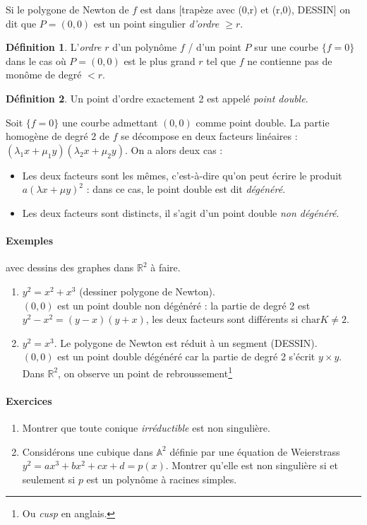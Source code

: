 \documentclass[a4paper, 11pt]{article}
\theoremstyle{definition}
\newtheorem{définition}{Définition}
\newcommand{\real}{\mathbb{R}}
\newcommand{\aff}{\mathbb{A}}
\newcommand{\carac}{\textrm{char}}
\begin{document}
Si le polygone de Newton de $f$ est dans [trapèze avec (0,r) et (r,0),
DESSIN] on dit que $P = (0,0)$ est un point singulier \emph{d'ordre
  $\geq r$}.

\begin{définition}
  L'\emph{ordre} $r$ d'un polynôme $f$ / d'un point $P$ sur une courbe
  $\{f=0\}$ dans le cas où $P = (0,0)$ est le plus grand $r$ tel que
  $f$ ne contienne pas de monôme de degré $< r$.
\end{définition}
\begin{définition}
  Un point d'ordre exactement 2 est appelé \emph{point double}.
\end{définition}

Soit $\{f=0\}$ une courbe admettant $(0,0)$ comme point double. La
partie homogène de degré 2 de $f$ se décompose en deux facteurs
linéaires : $(\lambda_1 x + \mu_1 y) (\lambda_2 x + \mu_2 y)$. On a
alors deux cas :
\begin{itemize}
\item Les deux facteurs sont les mêmes, c'est-à-dire qu'on peut écrire
  le produit $a(\lambda x + \mu y)^2$ : dans ce cas, le point double
  est dit \emph{dégénéré}. 
\item Les deux facteurs sont distincts, il s'agit d'un point double
  \emph{non dégénéré}.
\end{itemize}

\paragraph{Exemples} avec dessins des graphes dans $\real^2$ à faire.
\begin{enumerate}
\item $y^2 = x^2 + x^3$ (dessiner polygone de Newton).\\
  $(0,0)$ est un point double non dégénéré : la partie de degré 2 est
  $y^2 - x^2 = (y-x)(y+x)$, les deux facteurs sont différents si
  $\carac K \neq 2$.
\item $y^2 = x^3$. Le polygone de Newton est réduit à un segment
  (DESSIN).\\
  $(0,0)$ est un point double dégénéré car la partie de
  degré 2 s'écrit $y \times y$. Dans $\real^2$, on observe un
  point de rebroussement\footnote{Ou \textit{cusp} en anglais.}
\end{enumerate}

\paragraph{Exercices}
\begin{enumerate}
\item Montrer que toute conique \emph{irréductible} est non
  singulière.
\item Considérons une cubique dans $\aff^2$ définie par une équation
  de Weierstrass $y^2 = ax^3 + bx^2 + cx + d = p(x)$. Montrer qu'elle
  est non singulière si et seulement si $p$ est un polynôme à racines
  simples.
\end{enumerate}
\end{document}
